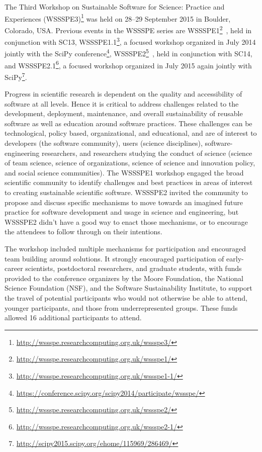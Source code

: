 \documentclass[11pt, oneside]{amsart}
\newcommand{\katznote}[1]{ {\textcolor{magenta}    { ***Dan:      #1 }}}
\newcommand{\gabnote}[1]{ {\textcolor{cyan}    { ***Gabrielle:     #1 }}}
\newcommand{\nchnote}[1]{  {\textcolor{orange}      { ***Neil: #1 }}}
\newcommand{\manishnote}[1]{  {\textcolor{violet}     { ***Manish: #1 }}}
\newcommand{\davidnote}[1]{  {\textcolor{darkgreen}      { ***David: #1 }}}
\begin{document}
%
%
%
%

The Third Workshop on Sustainable Software for Science: Practice and Experiences
(WSSSPE3)\footnote{\url{http://wssspe.researchcomputing.org.uk/wssspe3/}} was
held on 28--29 September 2015 in Boulder, Colorado, USA. Previous events in the
WSSSPE series are
WSSSPE1\footnote{\url{http://wssspe.researchcomputing.org.uk/wssspe1/}}~\cite{WSSSPE1-pre-report,WSSSPE1},
held in conjunction with SC13,
WSSSPE1.1\footnote{\url{http://wssspe.researchcomputing.org.uk/wssspe1-1/}}, a
focused workshop organized in July 2014 jointly with the SciPy
conference\footnote{\url{https://conference.scipy.org/scipy2014/participate/wssspe/}},
WSSSPE2\footnote{\url{http://wssspe.researchcomputing.org.uk/wssspe2/}}~\cite{WSSSPE2-pre-report,WSSSPE2},
held in conjunction with SC14, and
WSSSPE2.1\footnote{\url{http://wssspe.researchcomputing.org.uk/wssspe2-1/}}, a
focused workshop organized in July 2015 again jointly with
SciPy\footnote{\url{http://scipy2015.scipy.org/ehome/115969/286469/}}.

Progress in scientific research is dependent on the quality and accessibility of
software at all levels. Hence it is critical to address challenges related to
the development, deployment, maintenance, and overall sustainability of reusable
software as well as education around software practices. These challenges can be
technological, policy based, organizational, and educational, and are of
interest to developers (the software community), users (science disciplines),
software-engineering researchers, and researchers studying the conduct of
science (science of team science, science of organizations, science of science
and innovation policy, and social science communities). The WSSSPE1 workshop
engaged the broad scientific community to identify challenges and best practices
in areas of interest to creating sustainable scientific software. WSSSPE2
invited the community to propose and discuss specific mechanisms to move towards
an imagined future practice for software development and usage in science and
engineering, but WSSSPE2 didn't have a good way to enact those mechanisms, or to
encourage the attendees to follow through on their intentions.

The workshop included multiple mechanisms for participation and encouraged team
building around solutions. It strongly encouraged participation of early-career
scientists, postdoctoral researchers, and graduate students, with funds provided
to the conference organizers by the Moore Foundation, the National Science
Foundation (NSF), and the Software Sustainability Institute, to support the
travel of potential participants who would not otherwise be able to attend,
younger participants, and those from underrepresented groups. These funds allowed
16 additional participants to attend.
\end{document}
